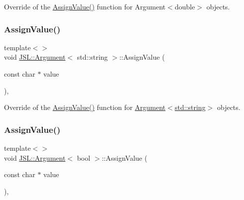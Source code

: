 Override of the \hyperlink{classJSL_1_1Argument_ac77530598054943c996dbb5fb677b844}{Assign\+Value()} function for Argument$<$double$>$ objects. 

\mbox{\label{classJSL_1_1Argument_af5ccee16ba3403ef62d4bec9d380c762}} 
\subsubsection{\texorpdfstring{Assign\+Value()}{AssignValue()}\hspace{0.1cm}{\footnotesize\ttfamily [4/5]}}
{\footnotesize\ttfamily template$<$$>$ \\
void \hyperlink{classJSL_1_1Argument}{J\+S\+L\+::\+Argument}$<$ std\+::string $>$\+::Assign\+Value (\begin{DoxyParamCaption}\item[{const char $\ast$}]{value }\end{DoxyParamCaption})\hspace{0.3cm}{\ttfamily [inline]}, {\ttfamily [private]}}



Override of the \hyperlink{classJSL_1_1Argument_ac77530598054943c996dbb5fb677b844}{Assign\+Value()} function for \hyperlink{classJSL_1_1Argument_ab438509a3c030516de72f3f493295bd5}{Argument$<$std\+::string$>$} objects. 

\mbox{\label{classJSL_1_1Argument_a0831822da0a2da47daa07d2e51b87d2a}} 
\subsubsection{\texorpdfstring{Assign\+Value()}{AssignValue()}\hspace{0.1cm}{\footnotesize\ttfamily [5/5]}}
{\footnotesize\ttfamily template$<$$>$ \\
void \hyperlink{classJSL_1_1Argument}{J\+S\+L\+::\+Argument}$<$ bool $>$\+::Assign\+Value (\begin{DoxyParamCaption}\item[{const char $\ast$}]{value }\end{DoxyParamCaption})\hspace{0.3cm}{\ttfamily [inline]}, {\ttfamily [private]}}



